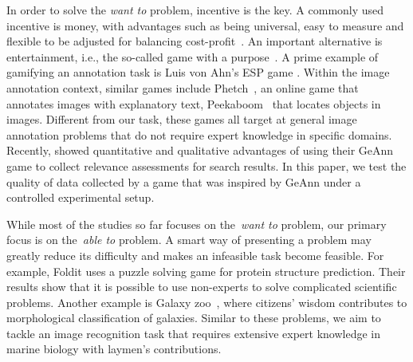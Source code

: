 In order to solve the \emph{want to} problem, incentive is the key.
A commonly used incentive is money, with advantages such as  
being universal, easy to measure and flexible to be adjusted
for balancing cost-profit~\cite{Horton:2010}. 
%
An important alternative is entertainment, i.e., the 
so-called game with a purpose~\cite{ahnl08:desi}. 
%
A prime example of gamifying an annotation task is Luis von Ahn's ESP 
game \cite{ahnl:04}. 
%
Within the image annotation context, similar games include Phetch~\cite{anhl06:impr}, 
an online game that annotates images with explanatory text, Peekaboom~\cite{ahnl06:peekaboom}
that locates objects in images. 
%
Different from our task, these games all target at general image annotation problems
that do not require expert knowledge in specific domains.
%
Recently, \citet{eickhoff12:qual} showed quantitative and qualitative advantages of 
using their GeAnn game to collect relevance assessments for search results. %
%
In this paper, we test the quality of data collected by a game that was inspired by GeAnn
under a controlled experimental setup.



While most of the studies so far focuses on the~\emph{want to} problem, 
our primary focus is on the~\emph{able to} problem.
%
A smart way of presenting a problem %
may greatly reduce its difficulty and makes an infeasible task become feasible. 
For example,  Foldit\cite{cooper2010:pred}
uses a puzzle solving game for protein structure prediction.
Their results show that it is possible to use non-experts to solve complicated
scientific problems.
Another example is Galaxy zoo~\cite{website:Galaxyzoo}, where citizens' wisdom
contributes to morphological classification of galaxies.
%
Similar to these problems, we aim to tackle an image recognition  
task that requires extensive expert knowledge in marine biology with laymen's contributions. 
%
%

